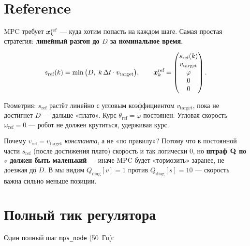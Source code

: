 \section{Reference}

MPC требует $\bm{x}^\text{ref}_k$ --- куда хотим попасть на каждом
шаге. Самая простая стратегия: \textbf{линейный разгон до $D$ за
номинальное время}.

\begin{formulabox}[title={Reference сценария}]
\begin{equation}
  s_\text{ref}(k) = \min\big(D,\;k\,\Delta t \cdot v_\text{target}\big),
  \qquad
  \bm{x}^\text{ref}_k = \begin{pmatrix} s_\text{ref}(k)\\ v_\text{target}\\ \varphi\\ 0\\ 0 \end{pmatrix}.
  \label{eq:reference}
\end{equation}
\end{formulabox}

Геометрия: $s_\text{ref}$ растёт линейно с угловым коэффициентом
$v_\text{target}$, пока не достигнет $D$ --- дальше «плато». Курс
$\theta_\text{ref} = \varphi$ постоянен. Угловая скорость
$\omega_\text{ref} = 0$ --- робот не должен крутиться, удерживая курс.

\begin{notebox}
Почему $v_\text{ref} = v_\text{target}$ \emph{константа}, а не «по
правилу»? Потому что в постоянной части $s_\text{ref}$ (после
достижения плато) скорость и так логически 0, но \textbf{штраф $\mathbf{Q}$
по $v$ должен быть маленький} --- иначе MPC будет «тормозить»
заранее, не доезжая до $D$. В  мы видим
$Q_\text{diag}[v] = 1$ против $Q_\text{diag}[s] = 10$ --- скорость
важна сильно меньше позиции.
\end{notebox}

\section{Полный тик регулятора}

Один полный шаг \texttt{mps\_node} (50~Гц):

